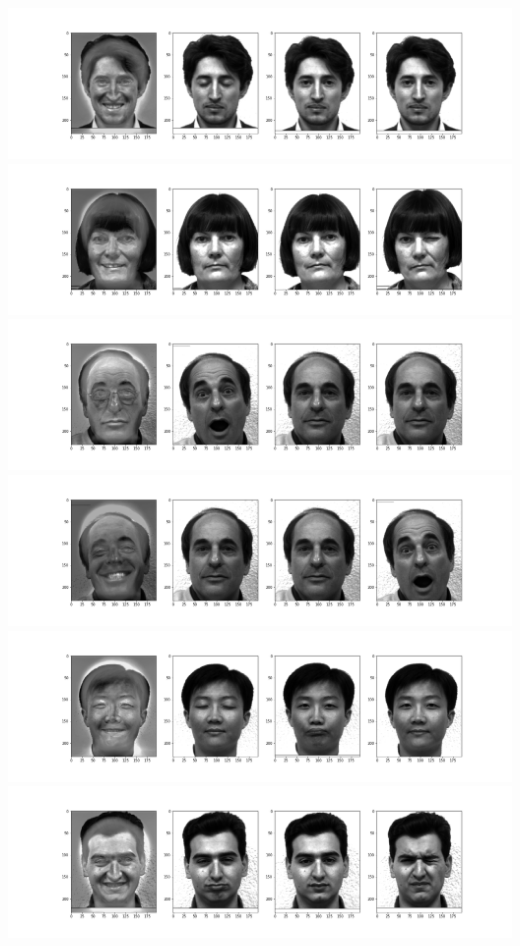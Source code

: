 \documentclass[]{article}
\begin{document}
\includegraphics[width=15cm]{5top3.png}
\includegraphics[width=15cm]{6top3.png}
\includegraphics[width=15cm]{7top3.png}
\includegraphics[width=15cm]{8top3.png}
\includegraphics[width=15cm]{9top3.png}
\includegraphics[width=15cm]{10top3.png}
\end{document}
